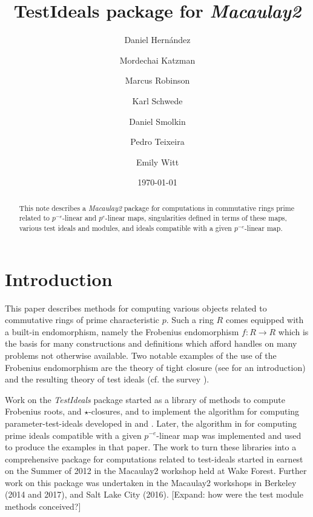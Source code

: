 \documentclass[11pt]{amsart}
\begin{document}
\title{{TestIdeals} package for \emph{Macaulay2}}
\author{Daniel Hern\'andez}
\author{Mordechai Katzman}
\author{Marcus Robinson}
\author{Karl Schwede}
\author{Daniel Smolkin}
\author{Pedro Teixeira}
\author{Emily Witt}
\date{\today}
\address{Department of Mathematics, University of Utah, 155 S 1400 E Room 233, Salt Lake City, UT, 84112}

\begin{abstract}
  This note describes a \emph{Macaulay2} package for computations in commutative rings prime related to $p^{-e}$-linear and $p^{e}$-linear  maps,
  singularities defined in terms of these maps,  various test ideals and modules, and ideals compatible with a given $p^{-e}$-linear map.
\end{abstract}




\maketitle

\section{Introduction}

This paper describes methods for computing various objects related to commutative rings of prime characteristic $p$.
Such a ring $R$ comes equipped with a built-in endomorphism, namely the Frobenius endomorphism $f:R \rightarrow R$ which is the basis for many constructions and definitions
which afford handles on many problems not otherwise available. Two notable examples of the use of the Frobenius endomorphism are the theory of tight closure 
(see \cite{HochsterHunekeTC1} for an introduction)
and the resulting theory of test ideals
(cf. the survey \cite{SchwedeTuckerTestIdealSurvey}).

Work on the \emph{TestIdeals} package started as a library of methods to compute  Frobenius roots, and $\star$-closures, and to implement the algorithm for computing parameter-test-ideals
developed in \cite{KatzmanParameterTestIdealOfCMRings} and \cite{KatzmanFrobeniusMapsOnInjectiveHulls}.
Later, the algorithm in  \cite{KatzmanSchwedeAlgorithm} for computing prime ideals compatible with a given $p^{-e}$-linear map was implemented and 
used to produce the examples in that paper. The work to turn these libraries into a comprehensive package for computations related to test-ideals
started in earnest on the Summer of 2012 in the Macaulay2 workshop held at Wake Forest. Further work on this package was undertaken in the Macaulay2 workshops in 
Berkeley (2014 and 2017), and Salt Lake City (2016). 
{\hfill\large\color{red} [Expand: how were the test module methods conceived?]}\\
\end{document}
